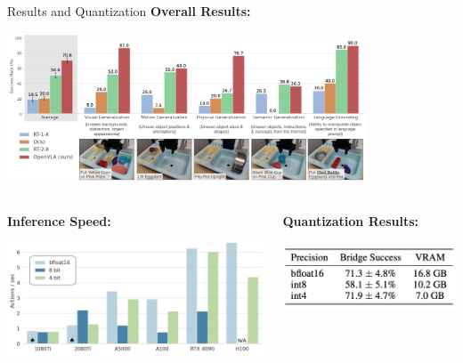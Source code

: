 \documentclass{beamer}
\begin{document}
\begin{frame}[t]{Results and Quantization}
    \textbf{Overall Results:}
    \begin{center}
        \includegraphics[width=0.8\textwidth]{./img/openvla_results.png}
    \end{center}
    \begin{columns}
		\begin{column}[t]{.33\textwidth}
            \textbf{Inference Speed:}\newline
            \vspace{-2em}
            \begin{center}
                \includegraphics[width=1.2\textwidth]{./img/openvla_speed.png}
            \end{center}
		\end{column}
        \hspace{0em}
		\begin{column}[t]{.33\textwidth}
            \textbf{Quantization Results:}\newline
            \begin{center}
                \includegraphics[width=1.0\textwidth]{./img/openvla_quant.png}
            \end{center}
		\end{column}
	\end{columns}
\end{frame}
\end{document}
